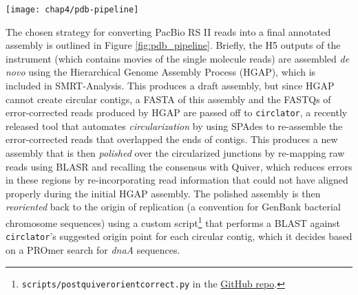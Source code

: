 \begin{figure*}[hb]
  \texttt{[image: chap4/pdb-pipeline]}               
  \caption[Outline of steps automated by \pathogendbpipeline]{\textbf{Outline of steps automated by \pathogendbpipeline.} Processes are depicted as boxes, with processes requiring potentially multiple runs indicated as a ``stack.'' An interim file format is depicted as a single arrow, and groups of files as doubled arrows. The pipeline concludes with deposition of a link to an IGB Quickload Directory for the completed assembly into PathogenDB.}
  \label{fig:pdb_pipeline}
\end{figure*}

The chosen strategy for converting PacBio RS II reads into a final annotated assembly is outlined in Figure \ref{fig:pdb_pipeline}. Briefly, the H5 outputs of the instrument (which contains movies of the single molecule reads) are assembled \emph{de novo} using the Hierarchical Genome Assembly Process\autocite{Chin2013} (HGAP), which is included in SMRT-Analysis. This produces a draft assembly, but since HGAP cannot create circular contigs, a FASTA of this assembly and the FASTQs of error-corrected reads produced by HGAP are passed off to \texttt{circlator},\autocite{Hunt2015} a recently released tool that automates \emph{circularization} by using SPAdes\autocite{Bankevich2012} to re-assemble the error-corrected reads that overlapped the ends of contigs. This produces a new assembly that is then \emph{polished} over the circularized junctions by re-mapping raw reads using BLASR\autocite{Chaisson2012} and recalling the consensus with Quiver,\autocite{Chin2013} which reduces errors in these regions by re-incorporating read information that could not have aligned properly during the initial HGAP assembly. The polished assembly is then \emph{reoriented} back to the origin of replication (a convention for GenBank bacterial chromosome sequences) using a custom script\footnote{ \texttt{scripts/post\textunderscore quiver\textunderscore orient\textunderscore correct.py} in the \href{https://github.com/powerpak/pathogendb-pipeline/blob/master/scripts/post\textunderscore quiver\textunderscore orient\textunderscore correct.py}{GitHub repo}.} that performs a BLAST against \texttt{circlator}'s suggested origin point for each circular contig, which it decides based on a PROmer\autocite{Kurtz2004} search for \emph{dnaA} sequences.


